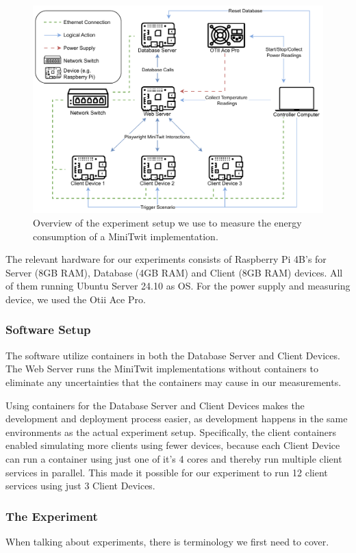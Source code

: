 \documentclass[main.tex]{subfiles}
\begin{document}
\begin{figure}[]
    \centering
    \includegraphics[width=.9\linewidth]{media/experiment/experiment-Setup.pdf}
    \caption{Overview of the experiment setup we use to measure the energy consumption of a MiniTwit implementation.}
    \label{fig:experiment-setup}
\end{figure}

The relevant hardware for our experiments consists of Raspberry Pi 4B's for Server (8GB RAM), Database (4GB RAM) and Client (8GB RAM) devices. All of them running Ubuntu Server 24.10 as OS. For the power supply and measuring device, we used the Otii Ace Pro.  

\subsubsection{Software Setup}

The software utilize containers in both the Database Server and Client Devices. The Web Server runs the MiniTwit implementations without containers to eliminate any uncertainties that the containers may cause in our measurements.

Using containers for the Database Server and Client Devices makes the development and deployment process easier, as development happens in the same environments as the actual experiment setup. Specifically, the client containers enabled simulating more clients using fewer devices, because each Client Device can run a container using just one of it's 4 cores and thereby run multiple client services in parallel. This made it possible for our experiment to run 12 client services using just 3 Client Devices. 

\subsubsection{The Experiment}
When talking about experiments, there is terminology we first need to cover.
\end{document}
